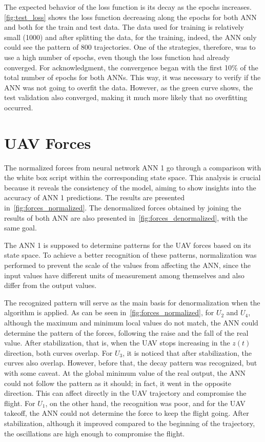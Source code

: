 The expected behavior of the loss function is its decay as the epochs increases.
\cref{fig:test_loss} shows the loss function decreasing along the epochs for both ANN and both for the train and test data.
The data used for training is relatively small (1000) and after splitting the data, for the training, indeed, the ANN only could see the pattern of 800 trajectories.
One of the strategies, therefore, was to use a high number of epochs, even though the loss function had already converged.
For acknowledgment, the convergence began with the first 10\% of the total number of epochs for both ANNs.
This way, it was necessary to verify if the ANN was not going to overfit the data. However, as the green curve shows, the test validation also converged, making it much more likely that no overfitting occurred.



\section{UAV Forces}

The normalized forces from neural network ANN 1 go through a comparison with the white box script within the corresponding state space. 
This analysis is crucial because it reveals the consistency of the model, aiming to show insights into the accuracy of ANN 1 predictions.
The results are presented in~\cref{fig:forces_normalized}.
The denormalized forces obtained by joining the results of both ANN are also presented in~\cref{fig:forces_denormalized}, with the same goal.

The ANN 1 is supposed to determine patterns for the UAV forces based on its state space.
To achieve a better recognition of these patterns, normalization was performed to prevent the scale of the values from affecting the ANN, since the input values have different units of measurement among themselves and also differ from the output values.

The recognized pattern will serve as the main basis for denormalization when the algorithm is applied. As can be seen in~\cref{fig:forces_normalized}, for \(U_2\) and \(U_4\), although the maximum and minimum local values do not match, the ANN could determine the pattern of the forces, following the raise and the fall of the real value.
After stabilization, that is, when the UAV stops increasing in the \(z(t)\) direction, both curves overlap.
For \(U_3\), it is noticed that after stabilization, the curves also overlap. However, before that, the decay pattern was recognized, but with some caveat.
At the global minimum value of the real output, the ANN could not follow the pattern as it should; in fact, it went in the opposite direction. This can affect directly in the UAV trajectory and compromise the flight.
For \(U_1\), on the other hand, the recognition was poor, and for the UAV takeoff, the ANN could not determine the force to keep the flight going.
After stabilization, although it improved compared to the beginning of the trajectory, the oscillations are high enough to compromise the flight.

